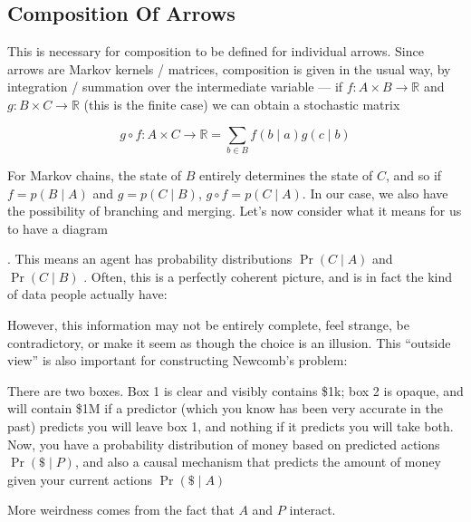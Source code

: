 \documentclass{article}
\begin{document}
	\subsection{Composition Of Arrows}
	This is necessary for composition to be defined for individual arrows. Since arrows are Markov kernels / matrices, composition is given in the usual way, by integration / summation over the intermediate variable --- if $f : A \times B \to \mathbb R$ and $g : B \times C \to \mathbb R$ (this is the finite case) we can obtain a stochastic matrix
	
	\[ g\circ f : A \times C \to \mathbb R =  \sum_{b \in B} f( b \mid a) g(c \mid b) \]
	
	For Markov chains, the state of $B$ entirely determines the state of $C$, and so if $f = p(B \mid A)$ and $g = p(C \mid B)$, $g\circ f = p(C \mid A)$. In our case, we also have the possibility of branching and merging. Let's now consider what it means for us to have a diagram 
	.
	This means an agent has probability distributions $\Pr(C\mid A)$ and $\Pr(C \mid B)$%
	. Often, this is a perfectly coherent picture, and is in fact the kind of data people actually have:
	


	However, this information may not be entirely complete, feel strange, be contradictory, or make it seem as though the choice is an illusion. This ``outside view'' is also important for constructing Newcomb's problem:
	
	\begin{example}[Newcomb]
		There are two boxes. Box 1 is clear and visibly contains \$1k; box 2 is opaque, and will contain \$1M if a predictor (which you know has been very accurate in the past) predicts you will leave box 1, and nothing if it predicts you will take both.
		Now, you have a probability distribution of money based on predicted actions $\Pr(\$ \mid P)$, and also a causal mechanism that predicts the amount of money given your current actions $\Pr(\$ \mid A)$
		\begin{center}
		\end{center}
		More weirdness comes from the fact that $A$ and $P$ interact.
	\end{example}
\end{document}
